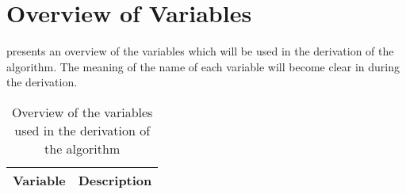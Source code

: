 \documentclass[a4paper, openany, oneside]{memoir}
\begin{document}
\section{Overview of Variables}
 presents an overview of the variables which will be used in the derivation of the algorithm. The meaning of the name of each variable will become clear in during the derivation.

\begin{table}[H]
    \centering
    \begin{tabularx}{\textwidth}{lY}
        \textbf{Variable} & \textbf{Description}\\ \hline
    \end{tabularx}
    \caption{Overview of the variables used in the derivation of the algorithm}
    \label{tab:reconstruction-overview-variables}
\end{table}
\end{document}
